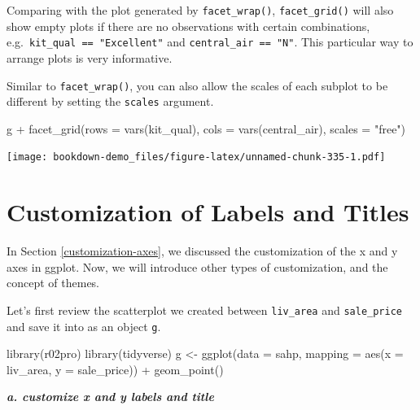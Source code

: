 \documentclass[
]{book}
\newenvironment{Shaded}{\begin{snugshade}}{\end{snugshade}}
\newcommand{\AttributeTok}[1]{\textcolor[rgb]{0.77,0.63,0.00}{#1}}
\newcommand{\FunctionTok}[1]{\textcolor[rgb]{0.00,0.00,0.00}{#1}}
\newcommand{\NormalTok}[1]{#1}
\newcommand{\OtherTok}[1]{\textcolor[rgb]{0.56,0.35,0.01}{#1}}
\newcommand{\SpecialCharTok}[1]{\textcolor[rgb]{0.00,0.00,0.00}{#1}}
\newcommand{\StringTok}[1]{\textcolor[rgb]{0.31,0.60,0.02}{#1}}
\begin{document}
Comparing with the plot generated by \texttt{facet\_wrap()}, \texttt{facet\_grid()} will also show empty plots if there are no observations with certain combinations, e.g.~\texttt{kit\_qual\ ==\ "Excellent"} and \texttt{central\_air\ ==\ "N"}. This particular way to arrange plots is very informative.

Similar to \texttt{facet\_wrap()}, you can also allow the scales of each subplot to be different by setting the \texttt{scales} argument.

\begin{Shaded}
\begin{Highlighting}[]
\NormalTok{g }\SpecialCharTok{+} \FunctionTok{facet\_grid}\NormalTok{(}\AttributeTok{rows =} \FunctionTok{vars}\NormalTok{(kit\_qual), }\AttributeTok{cols =} \FunctionTok{vars}\NormalTok{(central\_air), }\AttributeTok{scales =} \StringTok{"free"}\NormalTok{)}
\end{Highlighting}
\end{Shaded}

\texttt{[image: bookdown-demo\_files/figure-latex/unnamed-chunk-335-1.pdf]}

\hypertarget{customization}{%
\section{Customization of Labels and Titles}\label{customization}}

In Section \ref{customization-axes}, we discussed the customization of the x and y axes in ggplot. Now, we will introduce other types of customization, and the concept of themes.

Let's first review the scatterplot we created between \texttt{liv\_area} and \texttt{sale\_price} and save it into as an object \texttt{g}.

\begin{Shaded}
\begin{Highlighting}[]
\FunctionTok{library}\NormalTok{(r02pro)}
\FunctionTok{library}\NormalTok{(tidyverse)}
\NormalTok{g }\OtherTok{\textless{}{-}} \FunctionTok{ggplot}\NormalTok{(}\AttributeTok{data =}\NormalTok{ sahp, }\AttributeTok{mapping =} \FunctionTok{aes}\NormalTok{(}\AttributeTok{x =}\NormalTok{ liv\_area, }\AttributeTok{y =}\NormalTok{ sale\_price)) }\SpecialCharTok{+} \FunctionTok{geom\_point}\NormalTok{()}
\end{Highlighting}
\end{Shaded}

\textbf{\emph{a. customize x and y labels and title}}
\end{document}
